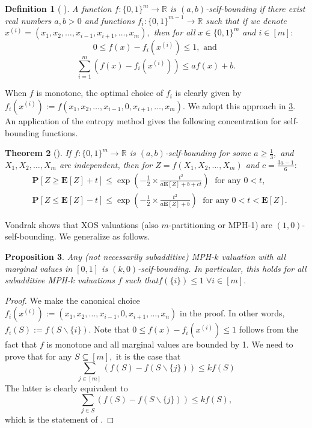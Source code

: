 \documentclass[11pt]{article}\usepackage{amsfonts}
\newtheorem{theorem}{Theorem}
\newtheorem{definition}[theorem]{Definition}
\newtheorem{proposition}[theorem]{Proposition}
\numberwithin{theorem}{subsection}
\newcommand{\prob}{\mathbf{P}}
\newcommand{\expect}{\mathbf{E}}
\begin{document}
\begin{definition}[{
\cite[Definition 2.3]{Vondrak10}}]
\label{def:selfboundingfunctions}
A function $f:\{0,1\}^m \longrightarrow \mathbb{R}$ is $(a,b)$-self-bounding if there exist real numbers $a,b>0$ and functions $f_i:\{0,1\}^{m-1}\longrightarrow \mathbb{R}$ such that if we denote\linebreak $x^{(i)} = (x_1, x_2, \ldots, x_{i-1}, x_{i+1}, \ldots, x_m),$ then for all $x\in \{0,1\}^m$ and $i\in [m]:$
$$
0\le f(x)-f_i(x^{(i)})\le 1, \text{ and }$$
$$
\sum_{i=1}^m (f(x) - f_i(x^{(i)}))\le 
af(x) + b. 
$$
\end{definition}

\noindent
When $f$ is monotone, the optimal choice of $f_i$ is clearly given by\linebreak
$f_i(x^{(i)}):=f(x_1, x_2, \ldots, x_{i-1},0, x_{i+1}, \ldots, x_m).$ We adopt this approach in \cref{lem:MPHslefbounding}.
An application of the entropy method gives the following concentration for self-bounding functions.

\begin{theorem}[{\cite[Theorem 3.3]{Vondrak10}}]If $f:\{0,1\}^m\longrightarrow \mathbb{R}$ is $(a,b)$-self-bounding for some $a\ge \frac{1}{3},$ and $X_1, X_2, \ldots, X_m$ are independent, then for $Z = f(X_1, X_2, \ldots, X_m)$ and $c = \frac{3a-1}{6}:$
\begin{equation*}
\begin{split}
    & \prob[Z\ge \expect[Z] + t]\le
\exp\left(-\frac{1}{2}\times\frac{t^2}{a\expect[Z] + b + ct}\right)\; \text{ for any }0<t,\\
    &
     \prob[Z\le \expect[Z] - t]\le
     \exp\left(-\frac{1}{2}\times\frac{t^2}{a\expect[Z] + b}\right)\;\text{ for any }0<t<\expect[Z].
\end{split}
\end{equation*}
\end{theorem}

\noindent
Vondrak \cite[Lemma 2.2]{Vondrak10} shows that XOS valuations (also $m$-partitioning or MPH-1) are $(1,0)$-self-bounding.
We generalize as follows.

\begin{proposition}
\label{lem:MPHslefbounding}
Any (not necessarily subadditive) MPH-$k$ valuation with all marginal values in $[0,1]$ is $(k,0)$-self-bounding. In particular, this holds for all subadditive MPH-$k$ valuations $f$ such that\linebreak $f(\{i\})\le 1\; \forall i \in [m].$
\end{proposition}
\begin{proof}
We make the canonical choice $f_i(x^{(i)}):=(x_1, x_2, \ldots, x_{i-1},0, x_{i+1}, \ldots, x_n)$ in the proof. In other words, $f_i(S):=f(S\backslash \{i\}).$ 
Note that $0\le f(x)-f_i(x^{(i)})\le 1$ follows from the fact that $f$ is monotone and all marginal values are bounded by 1.
We need to prove that for any $S\subseteq [m],$ it is the case that 
$$
\sum_{j \in [m]}(f(S) - f(S\backslash\{j\}))\le 
kf(S)$$
The latter is clearly equivalent to 
$$
\sum_{j \in S}(f(S) - f(S\backslash\{j\}))\le 
kf(S),
$$
which is the statement of \cite[Lemma 6.2]{EzraFNTW19}.
\end{proof}
\end{document}
